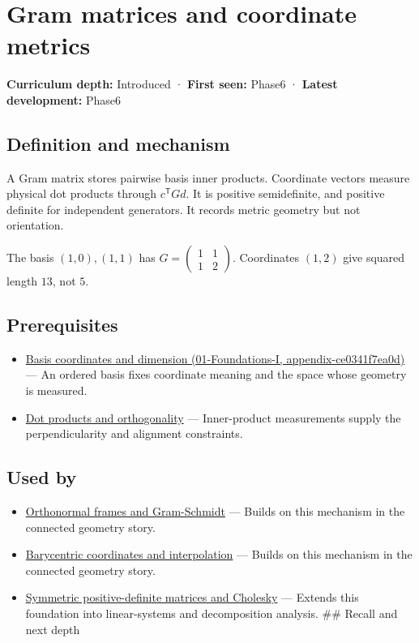 \hypertarget{appendix-3b863809f82a}{}
\section{Gram matrices and coordinate metrics}\label{appendix-3b863809f82a-gram-matrices-and-coordinate-metrics}

\textbf{Curriculum depth:} Introduced · \textbf{First seen:} Phase6 · \textbf{Latest development:} Phase6

\subsection{Definition and mechanism}\label{appendix-3b863809f82a-definition-and-mechanism}

A Gram matrix stores pairwise basis inner products. Coordinate vectors measure physical dot products through \(c^\mathsf TGd\). It is positive semidefinite, and positive definite for independent generators. It records metric geometry but not orientation.

The basis \((1,0),(1,1)\) has \(G=\begin{pmatrix}1&1\\1&2\end{pmatrix}\). Coordinates \((1,2)\) give squared length \(13\), not \(5\).

\subsection{Prerequisites}\label{appendix-3b863809f82a-prerequisites}

\begin{itemize}
\tightlist
\item
  \href{../01-Foundations-I/main.pdf\#nameddest=appendix-ce0341f7ea0d}{Basis coordinates and dimension (01-Foundations-I, appendix-ce0341f7ea0d)} --- An ordered basis fixes coordinate meaning and the space whose geometry is measured.
\item
  \hyperref[appendix-8bc4e8fc547c]{Dot products and orthogonality} --- Inner-product measurements supply the perpendicularity and alignment constraints.
\end{itemize}

\subsection{Used by}\label{appendix-3b863809f82a-used-by}

\begin{itemize}
\tightlist
\item
  \hyperref[appendix-c39f1ed34271]{Orthonormal frames and Gram-Schmidt} --- Builds on this mechanism in the connected geometry story.
\item
  \hyperref[appendix-02b9d9a81dca]{Barycentric coordinates and interpolation} --- Builds on this mechanism in the connected geometry story.
\item
  \hyperref[appendix-50d2ea3c9b26]{Symmetric positive-definite matrices and Cholesky} --- Extends this foundation into linear-systems and decomposition analysis. \#\# Recall and next depth
\end{itemize}

